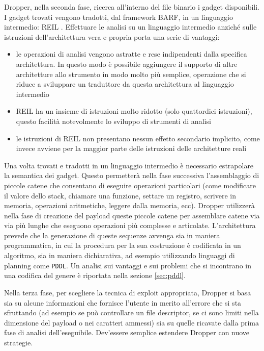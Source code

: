 Dropper, nella seconda fase, ricerca all'interno del file binario i
gadget disponibili. I gadget trovati vengono tradotti, dal framework
BARF, in un linguaggio intermedio: REIL
\cite{dullien-09}. Effettuare le analisi su un linguaggio
intermedio anziché sulle istruzioni dell'architettura vera e propria
porta una serie di vantaggi:

\begin{itemize}
 \item le operazioni di analisi vengono astratte e rese
   indipendenti dalla specifica architettura. In questo modo è
   possibile aggiungere il supporto di altre architetture allo
   strumento in modo molto più semplice, operazione che si riduce a
   sviluppare un traduttore da questa architettura al linguaggio
   intermedio

 \item REIL ha un insieme di istruzioni molto ridotto (solo
   quattordici istruzioni), questo facilità notevolmente lo sviluppo
   di strumenti di analisi

  \item le istruzioni di REIL non presentano nessun effetto
  secondario implicito, come invece avviene per la maggior parte delle
  istruzioni delle architetture reali

\end{itemize}

Una volta trovati e tradotti in un linguaggio intermedio è necessario
estrapolare la semantica dei gadget. Questo permetterà nella fase
successiva l'assemblaggio di piccole catene che consentano di eseguire
operazioni particolari (come modificare il valore dello stack,
chiamare una funzione, settare un registro, scrivere in memoria,
operazioni aritmetiche, leggere dalla memoria, ecc). Dropper
utilizzerà nella fase di creazione del payload queste piccole catene
per assemblare catene via via più lunghe che eseguono operazioni più
complesse e articolate. L'architettura prevede che la generazione di
queste sequenze avvenga sia in maniera programmatica, in cui la
procedura per la sua costruzione è codificata in un algoritmo, sia in
maniera dichiarativa, ad esempio utilizzando linguaggi di planning
come \lstinline{PDDL}\cite{pddl-97}. Un analisi sui vantaggi e sui
problemi che si incontrano in una codifica del genere è riportata
nella sezione \ref{sec:pddl}.

Nella terza fase, per scegliere la tecnica di exploit appropriata,
Dropper si basa sia su alcune informazioni che fornisce l'utente in
merito all'errore che si sta sfruttando (ad esempio se può controllare
un file descriptor, se ci sono limiti nella dimensione del payload o
nei caratteri ammessi) sia su quelle ricavate dalla prima fase di
analisi dell'eseguibile. Dev'essere semplice estendere Dropper con
nuove strategie.

